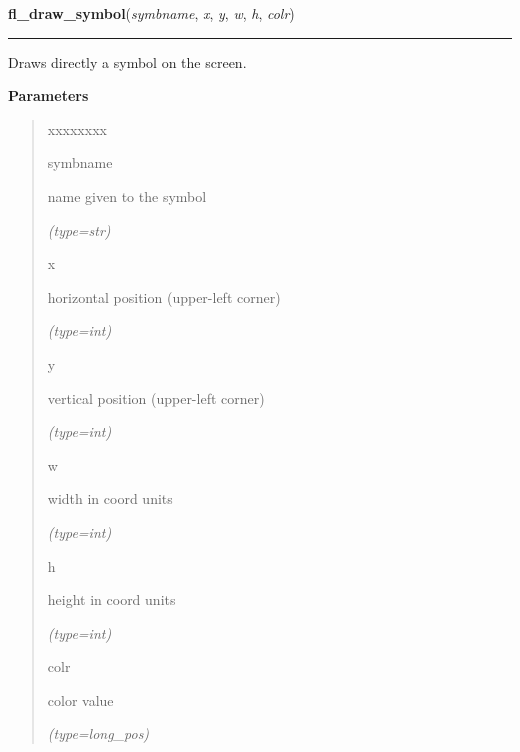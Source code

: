 \hspace{.8\funcindent}\begin{boxedminipage}{\funcwidth}

    \raggedright \textbf{fl\_draw\_symbol}(\textit{symbname}, \textit{x}, \textit{y}, \textit{w}, \textit{h}, \textit{colr})

    \vspace{-1.5ex}

    \rule{\textwidth}{0.5\fboxrule}
\setlength{\parskip}{2ex}
    Draws directly a symbol on the screen.

\setlength{\parskip}{1ex}
      \textbf{Parameters}
      \vspace{-1ex}

      \begin{quote}
        \begin{Ventry}{xxxxxxxx}

          \item[symbname]

          name given to the symbol

            {\it (type=str)}

          \item[x]

          horizontal position (upper-left corner)

            {\it (type=int)}

          \item[y]

          vertical position (upper-left corner)

            {\it (type=int)}

          \item[w]

          width in coord units

            {\it (type=int)}

          \item[h]

          height in coord units

            {\it (type=int)}

          \item[colr]

          color value

            {\it (type=long\_pos)}

        \end{Ventry}

      \end{quote}


\end{boxedminipage}
